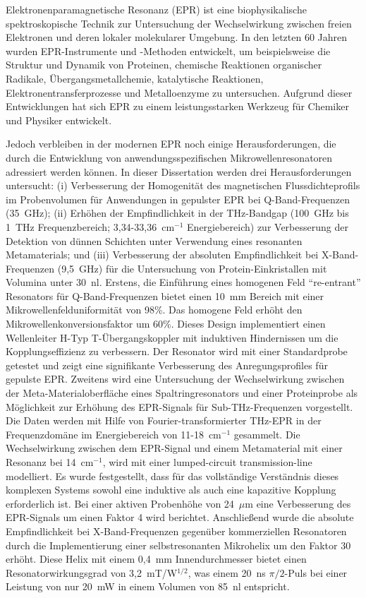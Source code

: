 \vspace{-2em}
Elektronenparamagnetische Resonanz (EPR) ist eine biophysikalische spektroskopische Technik zur Untersuchung der Wechselwirkung zwischen freien Elektronen und deren lokaler molekularer Umgebung. In den letzten 60 Jahren wurden EPR-Instrumente und -Methoden entwickelt, um beispielsweise die Struktur und Dynamik von Proteinen, chemische Reaktionen organischer Radikale, Übergangsmetallchemie, katalytische Reaktionen, Elektronentransferprozesse und Metalloenzyme zu untersuchen. Aufgrund dieser Entwicklungen hat sich EPR zu einem leistungsstarken Werkzeug für Chemiker und Physiker entwickelt.

Jedoch verbleiben in der modernen EPR noch einige Herausforderungen, die durch die Entwicklung von anwendungsspezifischen Mikrowellenresonatoren adressiert werden können. In dieser Dissertation werden drei Herausforderungen untersucht: (i) Verbesserung der Homogenität des magnetischen Flussdichteprofils im Probenvolumen für Anwendungen in gepulster EPR bei Q-Band-Frequenzen (35~GHz); (ii) Erhöhen der Empfindlichkeit in der THz-Bandgap (100~GHz bis 1~THz Frequenzbereich; 3{,}34-33{,}36~cm$^{-1}$ Energiebereich) zur Verbesserung der Detektion von dünnen Schichten unter Verwendung eines resonanten Metamaterials; und (iii) Verbesserung der absoluten Empfindlichkeit bei X-Band-Frequenzen (9{,}5~GHz) für die Untersuchung von Protein-Einkristallen mit Volumina unter 30~nl. Erstens, die Einführung eines homogenen Feld ``re-entrant'' \cylTE{} Resonators für Q-Band-Frequenzen bietet einen 10~mm Bereich mit einer Mikrowellenfelduniformität von 98\%. Das homogene Feld erhöht den Mikrowellenkonversionsfaktor um 60\%. Dieses Design implementiert einen Wellenleiter H-Typ T-Übergangskoppler mit induktiven Hindernissen um die Kopplungseffizienz zu verbessern. Der Resonator wird mit einer Standardprobe getestet und zeigt eine signifikante Verbesserung des Anregungsprofiles für gepulste EPR. Zweitens wird eine Untersuchung der Wechselwirkung zwischen der Meta-Materialoberfläche eines Spaltringresonators und einer Proteinprobe als Möglichkeit zur Erhöhung des EPR-Signals für Sub-THz-Frequenzen vorgestellt. Die Daten werden mit Hilfe von Fourier-transformierter THz-EPR in der Frequenzdomäne im Energiebereich von 11-18~cm$^{-1}$ gesammelt.  Die Wechselwirkung zwischen dem EPR-Signal und einem Metamaterial mit einer Resonanz bei 14~cm$^{-1}$, wird mit einer lumped-circuit transmission-line modelliert. Es wurde festgestellt, dass für das vollständige Verständnis dieses komplexen Systems sowohl eine induktive als auch eine kapazitive Kopplung erforderlich ist. Bei einer aktiven Probenhöhe von 24~$\mu$m eine Verbesserung des EPR-Signals um einen Faktor 4 wird berichtet. Anschließend wurde die absolute Empfindlichkeit bei X-Band-Frequenzen gegenüber kommerziellen Resonatoren durch die Implementierung einer selbstresonanten Mikrohelix um den Faktor 30 erhöht. Diese Helix mit einem 0{,}4~mm Innendurchmesser bietet einen Resonatorwirkungsgrad von 3{,}2~mT/W$^{1/2}$, was einem 20~ns $\pi/2$-Puls bei einer Leistung von nur 20~mW in einem Volumen von 85~nl entspricht. %
